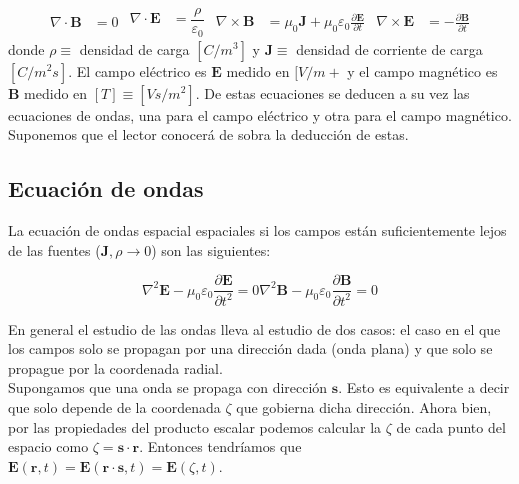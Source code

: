 \documentclass[12pt,a4paper]{article}
\newcommand{\parciales}[2]{\frac{\partial #1}{\partial #2}}
\newcommand{\rota}{\nabla \times}
\newcommand{\dive}{\nabla \cdot}
\newcommand{\Bn}{\mathbf{B}}
\newcommand{\En}{\mathbf{E}}
\newcommand{\Jn}{\mathbf{J}}
\newcommand{\rn}{\mathbf{r}}
\newcommand{\sn}{\mathbf{s}}
\numberwithin{equation}{section}
\numberwithin{figure}{section}
\begin{document}
\begin{subequations}\label{Ec:4.1.Maxwell}
\begin{align}
\dive \Bn & = 0 \label{Ec:4.1.a.DivB}
\end{align}
\begin{align}
\dive \En & = \dfrac{\rho}{\varepsilon_0} \label{Ec:4.1.b.DivE}
\end{align}
\begin{align}
\rota \Bn  & = \mu_0 \Jn + \mu_0 \varepsilon_0 \parciales{\En}{t} \label{Ec:4.1.c.RotB}
\end{align}
\begin{align}
\rota \En  & = -  \parciales{\Bn}{t} \label{Ec:4.1.d.RotE}
\end{align}
\end{subequations}
donde $\rho \equiv$ densidad de carga $[C/m^3]$ y $\Jn \equiv$ densidad de corriente de carga $[C/m^2 s]$. El campo eléctrico es $\En$ medido en $[V/m+$ y el campo magnético es $\Bn$ medido en $[T] \equiv [V s/ m^2]$. De estas ecuaciones se deducen a su vez las ecuaciones de ondas, una para el campo eléctrico y otra para el campo magnético. Suponemos que el lector conocerá de sobra la deducción de estas.


\subsection{Ecuación de ondas}

La ecuación de ondas espacial espaciales si los campos están suficientemente lejos de las fuentes ($\Jn,\rho \rightarrow 0$) son las siguientes:


\begin{subequations}
\begin{equation}
\nabla^2 \En - \mu_0 \varepsilon_0 \parciales{\En}{t^2} = 0 \label{Ec:4.2.a.Ondas}
\end{equation}
\begin{equation}
\nabla^2 \Bn - \mu_0 \varepsilon_0 \parciales{\Bn}{t^2} = 0 \label{Ec:4.2.b.Ondas}
\end{equation}
\end{subequations}  


En general el estudio de las ondas lleva al estudio de dos casos: el caso en el que los campos solo se propagan por una dirección dada (onda plana) y que solo se propague por la coordenada radial. \\

Supongamos que una onda se propaga con dirección $\sn$. Esto es equivalente a decir que solo depende de la coordenada $\zeta$ que gobierna dicha dirección. Ahora bien, por las propiedades del producto escalar podemos calcular la $\zeta$ de cada punto del espacio como $\zeta = \sn \cdot \rn$. Entonces tendríamos que $\En (\rn,t) = \En ( \rn \cdot \sn, t) = \En (\zeta, t)$. \\
\end{document}

